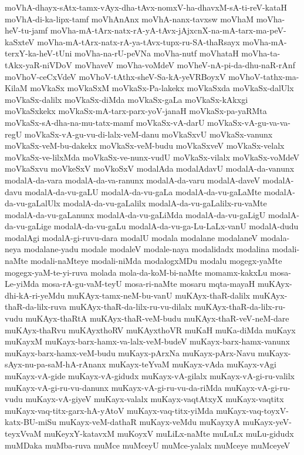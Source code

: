 {moVhA-dhayx-sAtx-tamx-vAyx-dha-tAvx-nomxV-ha-dhavxM-sA-ti-reV-kataH
moVhA-di-ka-lipx-tamf
moVhAnAnx
moVhA-nanx-tavxsw
moVhaM
moVha-heV-tu-jamf
moVha-mA-tArx-natx-rA-yA-tAvx-jAjxcnX-na-mA-tarx-ma-peV-kaSxteV
moVha-mA-tArx-natx-rA-ya-tAvx-tupx-ru-SA-thaRsayx
moVha-mA-terxY-ka-heV-tUni
moVha-na-rU-peVNa
moVha-nutf
moVhataH
moVha-ta-tAkx-yaR-niVDoV
moVhaveV
moVha-voMdeV
moVheV-nA-pi-da-dhu-naR-rAnf
moVhoV-ceCxVdeV
moVhoV-tAthx-sheV-Sa-kA-yeVRBoyxV
moVhoV-tathx-ma-KilaM
moVkaSx
moVkaSxM
moVkaSx-Pa-lakekx
moVkaSxda
moVkaSx-dalUlx
moVkaSx-dalilx
moVkaSx-diMda
moVkaSx-gaLa
moVkaSx-kAkxgi
moVkaSxkekx
moVkaSx-mA-tarx-parx-yoV-janaH
moVkaSx-pa-yaRMta
moVkaSx-sA-dha-na-mu-tatx-mamf
moVkaSx-vA-darU
moVkaSx-vA-gu-va-va-regU
moVkaSx-vA-gu-vu-di-lalx-veM-danu
moVkaSxvU
moVkaSx-vanunx
moVkaSx-veM-bu-dakekx
moVkaSx-veM-budu
moVkaSxveV
moVkaSx-velalx
moVkaSx-ve-lilxMda
moVkaSx-ve-nunx-vudU
moVkaSx-vilalx
moVkaSx-voMdeV
moVkaSxvu
moVkeSxV
moVkoSxV
modalAda
modalAdavU
modalA-da-vanunx
modalA-da-vara
modalA-da-va-ranunx
modalA-da-varu
modalA-daveV
modalA-davu
modalA-da-vu-gaLU
modalA-da-vu-gaLa
modalA-da-vu-gaLaMte
modalA-da-vu-gaLalUlx
modalA-da-vu-gaLalilx
modalA-da-vu-gaLalilx-ru-vaMte
modalA-da-vu-gaLanunx
modalA-da-vu-gaLiMda
modalA-da-vu-gaLigU
modalA-da-vu-gaLige
modalA-da-vu-gaLu
modalA-da-vu-ga-Lu-LaLx-vanU
modalA-dudu
modalAgi
modalA-gi-ruvu-dara
modalU
modala
modalane
modalaneV
modala-neya
modalane-yadu
modale
modaleV
modale-naya
modalidadx
modalina
modali-naMte
modali-naMteye
modali-niMda
modalogxMDu
modalu
mogegx-yaMte
mogegx-yaM-te-yi-ruva
molada
mola-da-koM-bi-naMte
momamx-kakxLu
mosa-Le-yiMda
mosa-rA-gu-vaM-teyU
mosa-ri-naMte
mosaru
mqta-mayaH
muKAyx-dhi-kA-ri-yeMdu
muKAyx-tamx-neM-bu-vanU
muKAyx-thaR-dalilx
muKAyx-thaR-da-lilx-ruva
muKAyx-thaR-da-lilx-ru-vu-dilalx
muKAyx-thaR-da-lilx-ru-vudu
muKAyx-thaRtA
muKAyx-thaR-veM-budu
muKAyx-thaR-veV-neM-dare
muKAyx-thaRvu
muKAyxthoRV
muKAyxthoVR
muKaH
muKa-diMda
muKayx
muKayxM
muKayx-barx-hamx-va-lalx-veM-budeV
muKayx-barx-hamx-vanunx
muKayx-barx-hamx-veM-budu
muKayx-pArxNa
muKayx-pArx-Navu
muKayx-sAyx-nu-pa-saM-hA-rAnanx
muKayx-teYvaM
muKayx-vAda
muKayx-vAgi
muKayx-vA-gide
muKayx-vA-gidudx
muKayx-vA-gilalx
muKayx-vA-gi-ru-valilx
muKayx-vA-gi-ru-vu-danunx
muKayx-vA-gi-ru-vu-da-riMda
muKayx-vA-gi-ru-vudu
muKayx-vA-giyeV
muKayx-valalx
muKayx-vaqtAtxyX
muKayx-vaqtitx
muKayx-vaq-titx-garx-hA-yAtoV
muKayx-vaq-titx-yiMda
muKayx-vaq-toyxV-katx-BU-miSu
muKayx-veM-dathaR
muKayx-veMdu
muKayxyA
muKayx-yeV-teyxVvaM
muKeyxY-katavxM
muKoyxV
muLiLx-naMte
muLuLx
muLu-gidudx
muMDaka
muMba-ruva
muMce
muMceyU
muMce-yalalx
muMceye
muMceyeV
}
